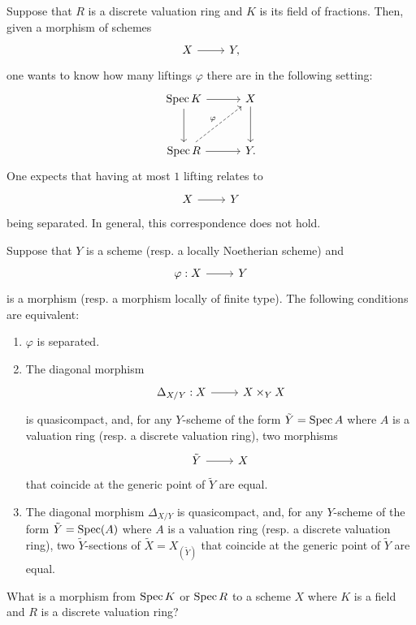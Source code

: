 \documentclass [11 pt, oneside] {article}
\begin{document}
Suppose that $R$ is a discrete valuation ring and $K$ is its field of fractions. Then, given a morphism of schemes 
\[
\begin{tikzcd}
X\ar[r]& Y,
\end{tikzcd}
\] 
one wants to know how many liftings $\varphi$ there are in the following setting:
\[
\begin{tikzcd}[column sep = 3 em, row sep = 3 em]
	\Spec K \ar[r]\ar[d]&X\ar[d]\\ \Spec R \ar[r]\ar[ur,dashed,"\varphi"] &Y.
\end{tikzcd}
\]
One expects that having at most $1$ lifting relates to 
\[
\begin{tikzcd}
X\ar[r]&Y
\end{tikzcd}
\]
 being separated. In general, this correspondence does not hold.
\begin{proposition}\label{}\text{}
Suppose that $Y$ is a scheme (resp. a locally Noetherian scheme) and
\[
\begin{tikzcd}
\varphi :X\ar[r]& Y
\end{tikzcd}
\] 
is a morphism (resp. a morphism locally of finite type). The following conditions are equivalent:
\begin{enumerate}
	\item $\varphi$ is separated.
	\item The diagonal morphism 
	\[
\begin{tikzcd}
\Delta_{X/Y} : X\ar[r]& X\times_Y X
\end{tikzcd}
\] 
is quasicompact, and, for any $Y$-scheme of the form $\tilde Y =\operatorname{Spec} A$ where $A$ is a valuation ring (resp. a discrete valuation ring), two morphisms 
\[
\begin{tikzcd}
\tilde Y\ar[r]&X
\end{tikzcd}
\] 
 that coincide at the generic point of $\tilde Y$ are equal.
	\item The diagonal morphism $\Delta_{X/Y}$ is quasicompact, and, for any $Y$-scheme of the form $\tilde Y = \operatorname{Spec} (A)$ where $A$ is a valuation ring (resp. a discrete valuation ring), two $\tilde Y$-sections of $\tilde X = X_{(\tilde Y)}$ that coincide at the generic point of $\tilde Y$ are equal.
\end{enumerate}
\end{proposition}

\begin{problem}
	What is a morphism from $\operatorname{Spec} K$ or $\operatorname{Spec} R$ to a scheme $X$ where $K$ is a field and $R$ is a discrete valuation ring?
\end{problem}
\end{document}
